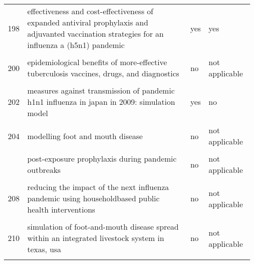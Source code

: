 \documentclass[
]{article}
\begin{document}
\begin{landscape}
\begin{longtable}{l>{\raggedright\arraybackslash}p{4cm}l>{\raggedright\arraybackslash}p{4cm}}
198 & effectiveness and cost-effectiveness of expanded antiviral prophylaxis and adjuvanted vaccination strategies for an influenza a (h5n1) pandemic & yes & yes\\
\cellcolor{gray!6}{199} & \cellcolor{gray!6}{engineering responses to pandemics} & \cellcolor{gray!6}{no} & \cellcolor{gray!6}{not applicable}\\
200 & epidemiological benefits of more-effective tuberculosis vaccines, drugs, and diagnostics & no & not applicable\\
\addlinespace
\cellcolor{gray!6}{201} & \cellcolor{gray!6}{household epidemics: modelling effects of early stage vaccination} & \cellcolor{gray!6}{no} & \cellcolor{gray!6}{not applicable}\\
202 & measures against transmission of pandemic h1n1 influenza in japan in 2009: simulation model & yes & no\\
\cellcolor{gray!6}{203} & \cellcolor{gray!6}{modeling vaccination campaigns and the fall/winter 2009 activity of the new a(h1n1) influenza in the northern hemisphere} & \cellcolor{gray!6}{yes} & \cellcolor{gray!6}{no}\\
204 & modelling foot and mouth disease & no & not applicable\\
\cellcolor{gray!6}{205} & \cellcolor{gray!6}{modelling of the influenza a(h1n1)v outbreak in mexico city, april-may 2009, with control sanitary measures} & \cellcolor{gray!6}{no} & \cellcolor{gray!6}{not applicable}\\
\addlinespace
206 & post-exposure prophylaxis during pandemic outbreaks & no & not applicable\\
\cellcolor{gray!6}{207} & \cellcolor{gray!6}{potential for a global dynamic of influenza a (h1n1)} & \cellcolor{gray!6}{no} & \cellcolor{gray!6}{not applicable}\\
208 & reducing the impact of the next influenza pandemic using householdbased public health interventions & no & not applicable\\
\cellcolor{gray!6}{209} & \cellcolor{gray!6}{seasonal transmission potential and activity peaks of the new influenza a(h1n1): a monte carlo likelihood analysis based on human mobility} & \cellcolor{gray!6}{no} & \cellcolor{gray!6}{not applicable}\\
210 & simulation of foot-and-mouth disease spread within an integrated livestock system in texas, usa & no & not applicable\\
\addlinespace
\cellcolor{gray!6}{211} & \cellcolor{gray!6}{the transmissibility and control of pandemic influenza a (h1n1) virus} & \cellcolor{gray!6}{no} & \cellcolor{gray!6}{not applicable}\\

\end{longtable}
\end{landscape}
\end{document}

